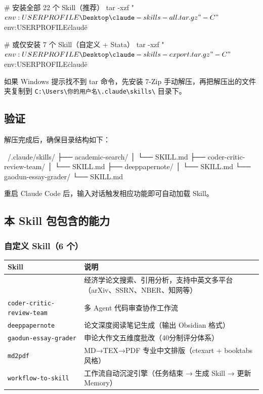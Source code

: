 \documentclass[12pt,a4paper]{ctexart}
\begin{document}
\begin{shcode}
# 安装全部 22 个 Skill（推荐）
tar -xzf "$env:USERPROFILE\Desktop\claude-skills-all.tar.gz" -C "$env:USERPROFILE\.claude\skills\"

# 或仅安装 7 个 Skill（自定义 + Stata）
tar -xzf "$env:USERPROFILE\Desktop\claude-skills-export.tar.gz" -C "$env:USERPROFILE\.claude\skills\"
\end{shcode}

如果 Windows 提示找不到 tar 命令，先安装 7-Zip 手动解压，再把解压出的文件夹复制到 \texttt{C:\textbackslash Users\textbackslash 你的用户名\textbackslash .claude\textbackslash skills\textbackslash} 目录下。

\subsection{验证}

解压完成后，确保目录结构如下：

\begin{shcode}
~/.claude/skills/
├── academic-search/
│   └── SKILL.md
├── coder-critic-review-team/
│   └── SKILL.md
├── deeppapernote/
│   └── SKILL.md
└── gaodun-essay-grader/
    └── SKILL.md
\end{shcode}

重启 Claude Code 后，输入对话触发相应功能即可自动加载 Skill。

\subsection{本 Skill 包包含的能力}

\subsubsection*{自定义 Skill（6 个）}

{
\centering
\begin{tabular}{>{\RaggedRight\arraybackslash}p{5.2cm}>{\RaggedRight\arraybackslash}p{9.3cm}}
\toprule
\textbf{Skill} & \textbf{说明} \\
\midrule
{\small\texttt{academic-search}} & 经济学论文搜索、引用分析，支持中英文多平台（arXiv、SSRN、NBER、知网等） \\
\midrule
{\small\texttt{coder-critic-review-team}} & 多 Agent 代码审查协作工作流 \\
\midrule
{\small\texttt{deeppapernote}} & 论文深度阅读笔记生成（输出 Obsidian 格式） \\
\midrule
{\small\texttt{gaodun-essay-grader}} & 申论大作文五维度批改（40分制评分体系） \\
\midrule
{\small\texttt{md2pdf}} & MD→TEX→PDF 专业中文排版（ctexart + booktabs 风格） \\
\midrule
{\small\texttt{workflow-to-skill}} & 工作流自动沉淀引擎（任务结束 → 生成 Skill → 更新 Memory） \\
\bottomrule
\end{tabular}
\par}
\end{document}
